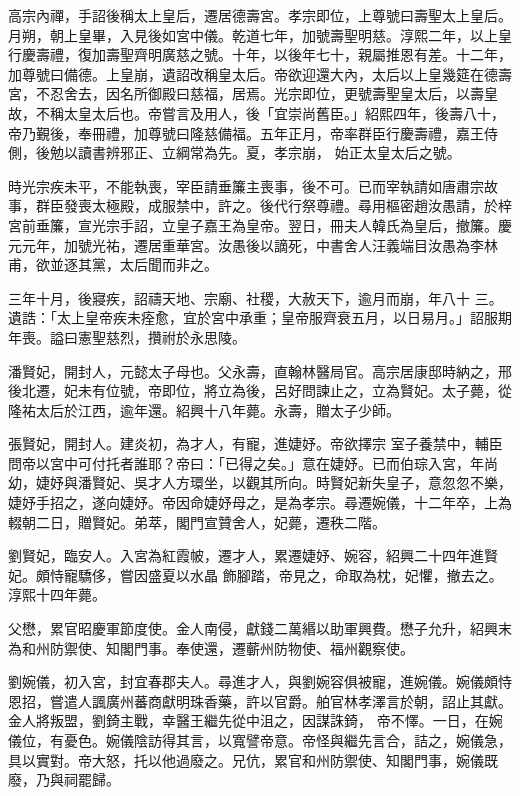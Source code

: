 \begin{pinyinscope}
 高宗內禪，手詔後稱太上皇后，遷居德壽宮。孝宗即位，上尊號曰壽聖太上皇后。月朔，朝上皇畢，入見後如宮中儀。乾道七年，加號壽聖明慈。淳熙二年，以上皇
 行慶壽禮，復加壽聖齊明廣慈之號。十年，以後年七十，親屬推恩有差。十二年，加尊號曰備德。上皇崩，遺詔改稱皇太后。帝欲迎還大內，太后以上皇幾筵在德壽宮，不忍舍去，因名所御殿曰慈福，居焉。光宗即位，更號壽聖皇太后，以壽皇故，不稱太皇太后也。帝嘗言及用人，後「宜崇尚舊臣。」紹熙四年，後壽八十，帝乃覲後，奉冊禮，加尊號曰隆慈備福。五年正月，帝率群臣行慶壽禮，嘉王侍側，後勉以讀書辨邪正、立綱常為先。夏，孝宗崩，
 始正太皇太后之號。



 時光宗疾未平，不能執喪，宰臣請垂簾主喪事，後不可。已而宰執請如唐肅宗故事，群臣發喪太極殿，成服禁中，許之。後代行祭尊禮。尋用樞密趙汝愚請，於梓宮前垂簾，宣光宗手詔，立皇子嘉王為皇帝。翌日，冊夫人韓氏為皇后，撤簾。慶元元年，加號光祐，遷居重華宮。汝愚後以謫死，中書舍人汪義端目汝愚為李林甫，欲並逐其黨，太后聞而非之。



 三年十月，後寢疾，詔禱天地、宗廟、社稷，大赦天下，逾月而崩，年八十
 三。遺誥：「太上皇帝疾未痊愈，宜於宮中承重；皇帝服齊衰五月，以日易月。」詔服期年喪。謚曰憲聖慈烈，攢祔於永思陵。



 潘賢妃，開封人，元懿太子母也。父永壽，直翰林醫局官。高宗居康邸時納之，邢後北遷，妃未有位號，帝即位，將立為後，呂好問諫止之，立為賢妃。太子薨，從隆祐太后於江西，逾年還。紹興十八年薨。永壽，贈太子少師。



 張賢妃，開封人。建炎初，為才人，有寵，進婕妤。帝欲擇宗
 室子養禁中，輔臣問帝以宮中可付托者誰耶？帝曰：「已得之矣。」意在婕妤。已而伯琮入宮，年尚幼，婕妤與潘賢妃、吳才人方環坐，以觀其所向。時賢妃新失皇子，意忽忽不樂，婕妤手招之，遂向婕妤。帝因命婕妤母之，是為孝宗。尋遷婉儀，十二年卒，上為輟朝二日，贈賢妃。弟萃，閣門宣贊舍人，妃薨，遷秩二階。



 劉賢妃，臨安人。入宮為紅霞帔，遷才人，累遷婕妤、婉容，紹興二十四年進賢妃。頗恃寵驕侈，嘗因盛夏以水晶
 飾腳踏，帝見之，命取為枕，妃懼，撤去之。淳熙十四年薨。



 父懋，累官昭慶軍節度使。金人南侵，獻錢二萬緡以助軍興費。懋子允升，紹興末為和州防禦使、知閣門事。奉使還，遷蘄州防物使、福州觀察使。



 劉婉儀，初入宮，封宜春郡夫人。尋進才人，與劉婉容俱被寵，進婉儀。婉儀頗恃恩招，嘗遣人諷廣州蕃商獻明珠香藥，許以官爵。舶官林孝澤言於朝，詔止其獻。金人將叛盟，劉錡主戰，幸醫王繼先從中沮之，因謀誅錡，
 帝不懌。一日，在婉儀位，有憂色。婉儀陰訪得其言，以寬譬帝意。帝怪與繼先言合，詰之，婉儀急，具以實對。帝大怒，托以他過廢之。兄伉，累官和州防禦使、知閣門事，婉儀既廢，乃與祠罷歸。




\end{pinyinscope}
